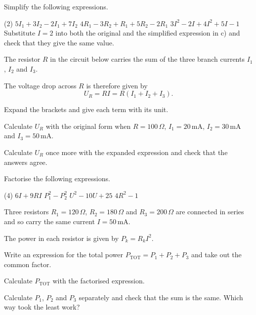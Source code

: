 
Simplify the following expressions.
\begin{delar}(2)
  \task $5I_1 + 3I_2 - 2I_1 + 7I_2$
  \task $4R_1 - 3R_2 + R_1 + 5R_2 - 2R_1$
  \task $3I^2 - 2I + 4I^2 + 5I - 1$
  \startnewitemline
  \task* Substitute $I = 2$ into both the original and the simplified expression in c) and check
    that they give the same value.
\end{delar}

The resistor $R$ in the circuit below carries the sum of the three branch currents $I_1$, $I_2$
and $I_3$.


The voltage drop across $R$ is therefore given by
\[
  U_R = RI = R(I_1 + I_2 + I_3).
\]
\begin{parts}
  \item Expand the brackets and give each term with its unit.
  \item Calculate $U_R$ with the original form when $R = 100\,\Omega$, $I_1 = 20\,\text{mA}$,
    $I_2 = 30\,\text{mA}$ and $I_3 = 50\,\text{mA}$.
  \item Calculate $U_R$ once more with the expanded expression and check that the answers agree.
\end{parts}

Factorise the following expressions.
\begin{delar}(4)
  \task $6I + 9RI$
  \task $P_1^2 - P_2^2$
  \task $U^2 - 10U + 25$
  \task $4R^2 - 1$
\end{delar}

Three resistors $R_1 = 120\,\Omega$, $R_2 = 180\,\Omega$ and $R_3 = 200\,\Omega$ are connected in
series and so carry the same current $I = 50\,\text{mA}$.


The power in each resistor is given by $P_k = R_k I^2$.
\begin{parts}
  \item Write an expression for the total power $P_{\text{TOT}} = P_1 + P_2 + P_3$ and take out
    the common factor.
  \item Calculate $P_{\text{TOT}}$ with the factorised expression.
  \item Calculate $P_1$, $P_2$ and $P_3$ separately and check that the sum is the same. Which way
    took the least work?
\end{parts}

